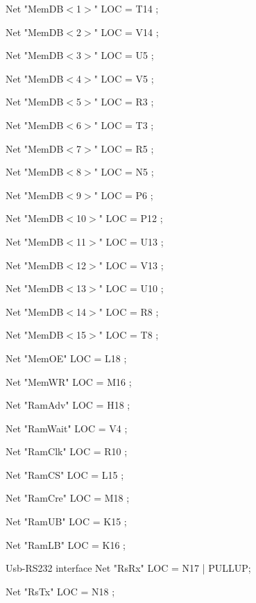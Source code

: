 Net "MemDB$<$1$>$" 
LOC = T14 ; 

Net "MemDB$<$2$>$" 
LOC = V14 ; 

Net "MemDB$<$3$>$" 
LOC = U5  ; 

Net "MemDB$<$4$>$" 
LOC = V5  ; 

Net "MemDB$<$5$>$" 
LOC = R3  ; 

Net "MemDB$<$6$>$" 
LOC = T3 ; 

Net "MemDB$<$7$>$"  
LOC = R5 ; 

Net "MemDB$<$8$>$"  
LOC = N5 ; 

Net "MemDB$<$9$>$"  
LOC = P6 ; 

Net "MemDB$<$10$>$"  
LOC = P12 ; 

Net "MemDB$<$11$>$"  
LOC = U13 ; 

Net "MemDB$<$12$>$"  
LOC = V13 ; 

Net "MemDB$<$13$>$"  
LOC = U10 ; 

Net "MemDB$<$14$>$"  
LOC = R8  ; 

Net "MemDB$<$15$>$"  
LOC = T8  ; 


Net "MemOE" 
LOC = L18 ; 

Net "MemWR" 
LOC = M16 ; 


Net "RamAdv" 
LOC = H18 ; 

Net "RamWait" 
LOC = V4 ; 

Net "RamClk" 
LOC = R10 ; 

Net "RamCS" 
LOC = L15 ; 

Net "RamCre" 
LOC = M18 ;

Net "RamUB" 
LOC = K15  ;

Net "RamLB" 
LOC = K16  ;

 Usb-RS232 interface
Net "RsRx" 
LOC = N17 | PULLUP; 

Net "RsTx" 
LOC = N18 ; 
